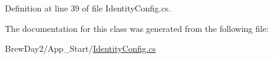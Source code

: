 Definition at line 39 of file Identity\+Config.\+cs.



The documentation for this class was generated from the following file\+:\begin{DoxyCompactItemize}
\item 
Brew\+Day2/\+App\+\_\+\+Start/\mbox{\hyperlink{_identity_config_8cs}{Identity\+Config.\+cs}}\end{DoxyCompactItemize}
